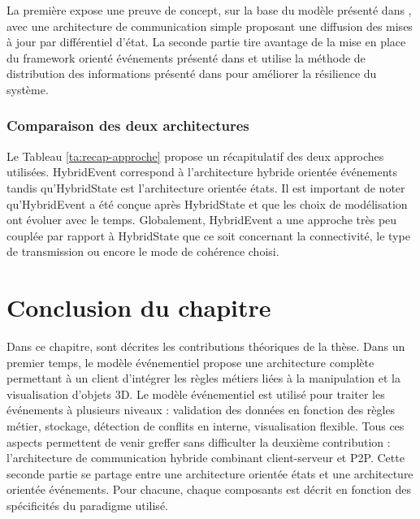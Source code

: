 La première expose une preuve de concept, sur la base du modèle présenté dans 
\cite{Desprat2015a}, avec une architecture de communication simple proposant 
une diffusion des mises à jour par différentiel d'état. La seconde partie 
tire avantage de la mise en place du \gls{framework} orienté événements présenté 
dans \cite{Desprat2016} et utilise la méthode de distribution des informations 
présenté dans \cite{Desprat2017} pour améliorer la résilience du système. 







\subsubsection{Comparaison des deux architectures}
Le Tableau \ref{ta:recap-approche} propose un récapitulatif des deux approches 
utilisées. HybridEvent correspond à l'architecture hybride \og orientée 
événements\fg{} tandis qu'HybridState est l'architecture \og orientée états\fg{}.
Il est important de noter qu'HybridEvent a été conçue après HybridState et que les 
choix de modélisation ont évoluer avec le temps. Globalement, HybridEvent a une 
approche très peu couplée par rapport à HybridState que ce soit concernant la 
connectivité, le type de transmission ou encore le mode de cohérence choisi.




\section{Conclusion du chapitre}
Dans ce chapitre, sont décrites les contributions théoriques de la thèse. 
Dans un premier temps, le modèle événementiel propose une architecture 
complète permettant à un client d'intégrer les règles métiers liées à la manipulation 
et la visualisation d'objets 3D. Le modèle événementiel est utilisé pour traiter les 
événements à plusieurs niveaux : validation des données en fonction des règles 
métier, stockage, détection de conflits en interne, visualisation flexible. Tous ces 
aspects permettent de venir greffer sans difficulter la deuxième contribution : 
l'architecture de communication hybride combinant client-serveur et \gls{P2P}.
Cette seconde partie se partage entre une architecture \og orientée états\fg{} et 
une architecture \og orientée événements\fg{}. Pour chacune, chaque composants 
est décrit en fonction des spécificités du paradigme utilisé. 

